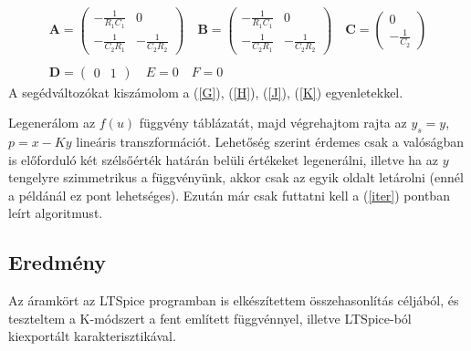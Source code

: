 \begin{equation}
    \begin{array}{c}
        \mathbf{A}=
    \begin{pmatrix}
        -\frac{1}{R_1C_1} & 0 \\
        -\frac{1}{C_2R_1} & -\frac{1}{C_2R_2}
    \end{pmatrix}
\quad  
\mathbf{B}=
    \begin{pmatrix}
        -\frac{1}{R_1C_1} & 0 \\
        -\frac{1}{C_2R_1} & -\frac{1}{C_2R_2}
    \end{pmatrix}
\quad 
\mathbf{C}=
    \begin{pmatrix}
        0 \\
        -\frac{1}{C_2}
    \end{pmatrix} \\ 
    \\ 
    \mathbf{D}=
    \begin{pmatrix}
        0 & 1
    \end{pmatrix}
\quad  E=0\quad F=0
    \end{array}
\end{equation}
A segédváltozókat kiszámolom a (\ref{G}), (\ref{H}), (\ref{J}), (\ref{K}) egyenletekkel. 

Legenerálom az $f(u)$ függvény táblázatát, majd végrehajtom rajta az $y_s=y$, 
$p=x-Ky$  lineáris transzformációt. Lehetőség szerint érdemes csak a valóságban is előforduló 
két szélsőérték határán belüli értékeket legenerálni, illetve ha az $y$ tengelyre szimmetrikus a függvényünk, 
akkor csak az egyik oldalt letárolni (ennél a példánál ez pont lehetséges).
Ezután már csak futtatni kell a (\ref{iter}) pontban leírt algoritmust.

\subsection{Eredmény}
Az áramkört az LTSpice programban is elkészítettem összehasonlítás céljából, és teszteltem a K-módszert 
a fent említett függvénnyel, illetve LTSpice-ból kiexportált karakterisztikával.

